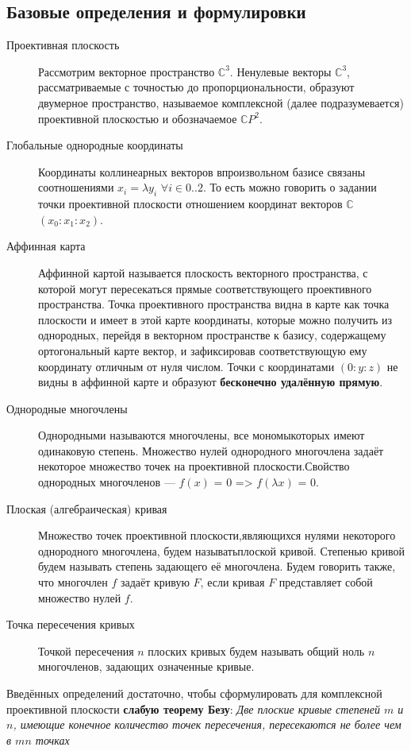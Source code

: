\documentclass[a4paper, 12pt]{article}
\begin{document}
\subsection{Базовые определения и формулировки}
\begin{description}
\item[Проективная плоскость]
Рассмотрим векторное пространство $\mathbb{C}^3$. Ненулевые векторы $\mathbb{C}^3$, рассматриваемые с точностью до пропорциональности, образуют двумерное пространство, называемое комплексной (далее подразумевается) проективной плоскостью и обозначаемое $\mathbb{C}P^2$.
\item[Глобальные однородные координаты]
Координаты коллинеарных векторов в\newline произвольном базисе связаны соотношениями $x_i = \lambda y_i$ $\forall i \in {0..2}$. То есть можно говорить о задании точки проективной плоскости отношением координат векторов $\mathbb{C}$ $(x_0:x_1:x_2)$.
\item[Аффинная карта]
Аффинной картой называется плоскость векторного пространства, с которой могут пересекаться прямые соответствующего проективного пространства. Точка проективного пространства видна в карте как точка плоскости и имеет в этой карте координаты, которые можно получить из однородных, перейдя в векторном пространстве к базису, содержащему ортогональный карте вектор, и зафиксировав соответствующую ему координату отличным от нуля числом. Точки с координатами $(0:y:z)$ не видны в аффинной карте и образуют \textbf{бесконечно удалённую прямую}.
\end{description}
\begin{description}
\item[Однородные многочлены] Однородными называются многочлены, все мономы\newline которых имеют одинаковую степень. Множество нулей однородного многочлена задаёт некоторое множество точек на проективной плоскости.\newline Свойство однородных многочленов --- $f(x)$ = $0$ => $f(\lambda x)$ = $0$.
\item[Плоская (алгебраическая) кривая]
Множество точек проективной плоскости,\newline являющихся нулями некоторого однородного многочлена, будем называть\newline плоской кривой. Степенью кривой будем называть степень задающего её многочлена. Будем говорить также, что многочлен $f$ задаёт кривую $F$, если кривая $F$ представляет собой множество нулей $f$.
\item[Точка пересечения кривых]
Точкой пересечения $n$ плоских кривых будем называть общий ноль $n$ многочленов, задающих означенные кривые.
\end{description}
Введённых определений достаточно, чтобы сформулировать для комплексной проективной плоскости \textbf{слабую теорему Безу}:
\textit{Две плоские кривые степеней $m$ и $n$, имеющие конечное количество точек пересечения, пересекаются не более чем в $mn$ точках}
\pagebreak
\end{document}
